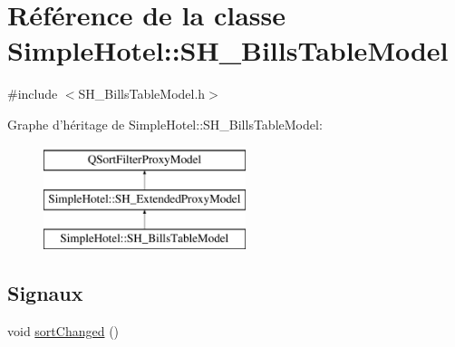 \hypertarget{classSimpleHotel_1_1SH__BillsTableModel}{\section{Référence de la classe Simple\-Hotel\-:\-:S\-H\-\_\-\-Bills\-Table\-Model}
\label{classSimpleHotel_1_1SH__BillsTableModel}
}


{\ttfamily \#include $<$S\-H\-\_\-\-Bills\-Table\-Model.\-h$>$}

Graphe d'héritage de Simple\-Hotel\-:\-:S\-H\-\_\-\-Bills\-Table\-Model\-:\begin{figure}[H]
\begin{center}
\leavevmode
\includegraphics[height=3.000000cm]{classSimpleHotel_1_1SH__BillsTableModel}
\end{center}
\end{figure}
\subsection*{Signaux}
\begin{DoxyCompactItemize}
\item 
void \hyperlink{classSimpleHotel_1_1SH__ExtendedProxyModel_adb9ae03a88cda8d9efbed47527b5186a}{sort\-Changed} ()
\end{DoxyCompactItemize}

